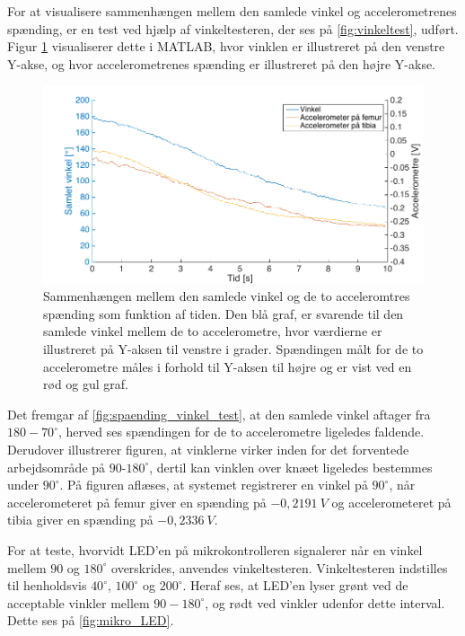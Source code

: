 For at visualisere sammenhængen mellem den samlede vinkel og accelerometrenes spænding, er en test ved hjælp af vinkeltesteren, der ses på \autoref{fig:vinkeltest}, udført.  
Figur \ref{fig:spaending_vinkel_test} visualiserer dette i MATLAB, hvor vinklen er illustreret på den venstre Y-akse, og hvor accelerometrenes spænding er illustreret på den højre Y-akse.

\begin{figure}[H]
\centering
\includegraphics[width=1\textwidth]{figures/spaending_vinkel_test}
\caption{Sammenhængen mellem den samlede vinkel og de to acceleromtres spænding som funktion af tiden. Den blå graf, er svarende til den samlede vinkel mellem de to accelerometre, hvor værdierne er illustreret på Y-aksen til venstre i grader. Spændingen målt for de to accelerometre måles i forhold til Y-aksen til højre og er vist ved en rød og gul graf.}
\label{fig:spaending_vinkel_test}
\end{figure}

\noindent
Det fremgar af \autoref{fig:spaending_vinkel_test}, at den samlede vinkel aftager fra $180-70^{\circ}$, herved ses spændingen for de to accelerometre ligeledes faldende.
Derudover illustrerer figuren, at vinklerne virker inden for det forventede arbejdsområde på $90$-$180^{\circ}$, dertil kan vinklen over knæet ligeledes bestemmes under $90^{\circ}$. 
På figuren aflæses, at systemet registrerer en vinkel på $90^{\circ}$, når  accelerometeret på femur giver en spænding på $-0,2191~V$ og accelerometeret på tibia giver en spænding på $-0,2336~V$.


For at teste, hvorvidt LED'en på mikrokontrolleren signalerer når en vinkel mellem $90$ og $180^{\circ}$ overskrides, anvendes vinkeltesteren. Vinkeltesteren indstilles til henholdsvis $40^{\circ}$, $100^{\circ}$ og $200^{\circ}$. 
Heraf ses, at LED'en lyser grønt ved de acceptable vinkler mellem $90-180^{\circ}$, og rødt ved vinkler udenfor dette interval. Dette ses på \autoref{fig:mikro_LED}.

